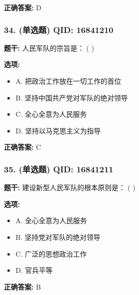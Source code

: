 \documentclass[12pt,UTF8]{ctexart}
\begin{document}
\textbf{正确答案:}
D

\vspace{0.3em}\hrulefill\vspace{0.7em}

\subsubsection*{34. (单选题) \small QID: 16841210}

\textbf{题干:}
人民军队的宗旨是： ( )

\textbf{选项:}
\begin{itemize}[leftmargin=*]

  \item A. 把政治工作放在一切工作的首位

  \item B. 坚持中国共产党对军队的绝对领导

  \item C. 全心全意为人民服务

  \item D. 坚持以马克思主义为指导

\end{itemize}

\textbf{正确答案:}
C

\vspace{0.3em}\hrulefill\vspace{0.7em}

\subsubsection*{35. (单选题) \small QID: 16841211}

\textbf{题干:}
建设新型人民军队的根本原则是： ( )

\textbf{选项:}
\begin{itemize}[leftmargin=*]

  \item A. 全心全意为人民服务

  \item B. 坚持党对军队的绝对领导

  \item C. 广泛的思想政治工作

  \item D. 官兵平等

\end{itemize}

\textbf{正确答案:}
B

\vspace{0.3em}\hrulefill\vspace{0.7em}
\end{document}
